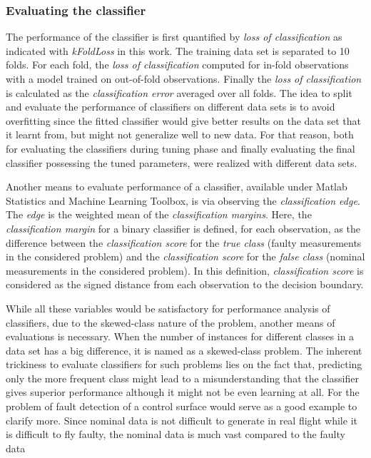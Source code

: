 \subsubsection{Evaluating the classifier}
\label{evalClassifier}

The performance of the classifier is first quantified by \emph{loss of classification} as indicated with \emph{kFoldLoss} in this work. 
The training data set is  separated to 10 folds. For each fold, the \emph{loss of classification} computed for in-fold observations with a model trained on out-of-fold observations. 
Finally the \emph{loss of classification} is calculated as the \emph{classification error} averaged over all folds.
The idea to split and evaluate the performance of classifiers on different data sets is to avoid overfitting since the fitted classifier would give better results on the data set that it learnt from, but might not generalize well to new data. 
For that reason, both for evaluating the classifiers during tuning phase and finally evaluating the final classifier possessing the tuned parameters, were realized with different data sets.

Another means to evaluate performance of a classifier, available under Matlab Statistics and Machine Learning Toolbox, is via observing the \emph{classification edge}. 
The \emph{edge} is the weighted mean of the \emph{classification margins}. 
Here, the \emph{classification margin} for a binary classifier is defined, for each observation, as the difference between the \emph{classification score} for the \emph{true class} (faulty measurements in the considered problem) and the \emph{classification score} for the \emph{false class} (nominal measurements in the considered problem). 
In this definition, \emph{classification score} is considered as the signed distance from each observation to the decision boundary.

While all these variables would be satisfactory for performance analysis of classifiers, due to the skewed-class nature of the problem, another means of evaluations is necessary.
When the number of instances for different classes in a data set has a big difference, it is named as a skewed-class problem. 
The inherent trickiness to evaluate classifiers for such problems lies on the fact that, predicting only the more frequent class might lead to a misunderstanding that the classifier gives superior performance although it might not be even learning at all. 
For the problem of fault detection of a control surface would serve as a good example to clarify more. 
Since nominal data is not difficult to generate in real flight while it is difficult to fly faulty, the nominal data is much vast compared to the faulty data 


